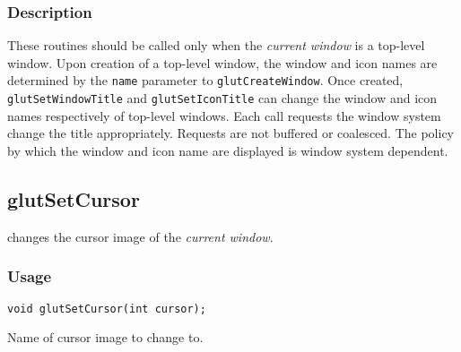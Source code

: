\subsubsection*{Description}

These routines should be called only when the {\em current window}
is a top-level window.  Upon creation of a top-level window,
the window and icon names are determined by the {\tt name}
parameter to {\tt glutCreateWindow}.  Once created, {\tt glutSetWindowTitle}
and {\tt glutSetIconTitle} can change the window and icon names
respectively of top-level windows.  Each call requests the
window system change the title appropriately.  Requests are not
buffered or coalesced.  The policy by which the window and icon name
are displayed is window system dependent.

\subsection{glutSetCursor}

 changes the cursor image of the {\em current window}.

\subsubsection*{Usage}
\begin{verbatim}
void glutSetCursor(int cursor);
\end{verbatim}
\begin{description}
\itemsep 0in
\item[{\tt cursor}]
Name of cursor image to change to.
\end{description}

